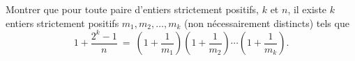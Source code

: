 Montrer que pour toute paire d'entiers strictement positifs, $k$ et $n$, il existe $k$ entiers strictement
positifs $m_1, m_2, \ldots, m_k$ (non nécessairement distincts) tels que
\[
1 + \frac{2^k - 1}{n} \ = \ \left(1 + \frac{1}{m_1}\right)\left(1 + \frac{1}{m_2}\right)\cdots\left(1 + \frac{1}{m_k}\right).
\]

